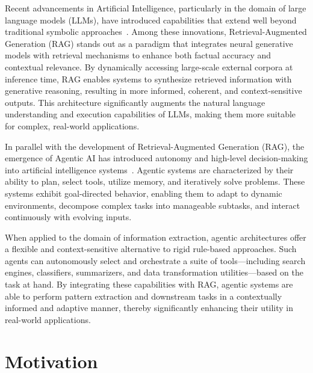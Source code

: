 \vspace{0.5cm}

Recent advancements in Artificial Intelligence, particularly in the domain of large language models (LLMs), have introduced capabilities that extend well beyond traditional symbolic approaches~\cite{lewis2020rag}. Among these innovations, Retrieval-Augmented Generation (RAG) stands out as a paradigm that integrates neural generative models with retrieval mechanisms to enhance both factual accuracy and contextual relevance. By dynamically accessing large-scale external corpora at inference time, RAG enables systems to synthesize retrieved information with generative reasoning, resulting in more informed, coherent, and context-sensitive outputs. This architecture significantly augments the natural language understanding and execution capabilities of LLMs, making them more suitable for complex, real-world applications.

\vspace{0.5cm}

In parallel with the development of Retrieval-Augmented Generation (RAG), the emergence of Agentic AI has introduced autonomy and high-level decision-making into artificial intelligence systems~\cite{shinn2023reflexion, wu2024agenttuning}. Agentic systems are characterized by their ability to plan, select tools, utilize memory, and iteratively solve problems. These systems exhibit goal-directed behavior, enabling them to adapt to dynamic environments, decompose complex tasks into manageable subtasks, and interact continuously with evolving inputs.

\vspace{0.5cm}

When applied to the domain of information extraction, agentic architectures offer a flexible and context-sensitive alternative to rigid rule-based approaches. Such agents can autonomously select and orchestrate a suite of tools—including search engines, classifiers, summarizers, and data transformation utilities—based on the task at hand. By integrating these capabilities with RAG, agentic systems are able to perform pattern extraction and downstream tasks in a contextually informed and adaptive manner, thereby significantly enhancing their utility in real-world applications.

\vspace{0.5cm}

\section{Motivation}

